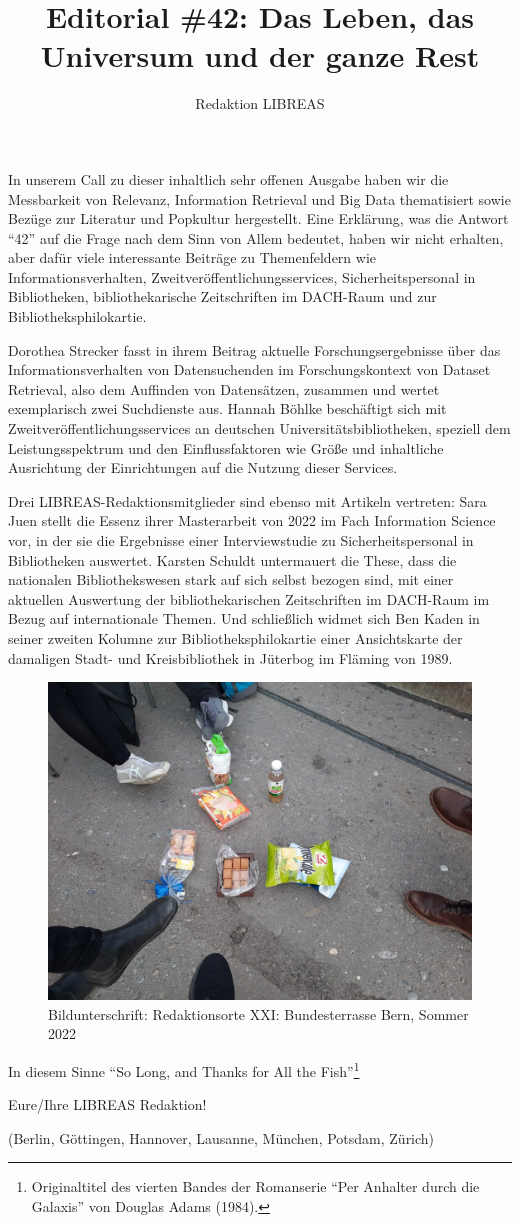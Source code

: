 \documentclass[a4paper,
fontsize=11pt,
oneside,
numbers=noperiodatend,
parskip=half-,
bibliography=totoc,
final
]{scrartcl}
\title{\LARGE{Editorial \#42: Das Leben, das Universum und der ganze Rest}}%
\author{Redaktion LIBREAS} %
\date{}
\begin{document}
\maketitle
\thispagestyle{fancyplain} 


In unserem Call zu dieser inhaltlich sehr offenen Ausgabe haben wir die
Messbarkeit von Relevanz, Information Retrieval und Big Data
thematisiert sowie Bezüge zur Literatur und Popkultur hergestellt. Eine
Erklärung, was die Antwort \enquote{42} auf die Frage nach dem Sinn von
Allem bedeutet, haben wir nicht erhalten, aber dafür viele interessante
Beiträge zu Themenfeldern wie Informationsverhalten,
Zweitveröffentlichungsservices, Sicherheitspersonal in Bibliotheken,
bibliothekarische Zeitschriften im DACH-Raum und zur
Bibliotheksphilokartie.

Dorothea Strecker fasst in ihrem Beitrag aktuelle Forschungsergebnisse
über das Informationsverhalten von Datensuchenden im Forschungskontext
von Dataset Retrieval, also dem Auffinden von Datensätzen, zusammen und
wertet exemplarisch zwei Suchdienste aus. Hannah Böhlke beschäftigt sich
mit Zweitveröffentlichungsservices an deutschen
Universitätsbibliotheken, speziell dem Leistungsspektrum und den
Einflussfaktoren wie Größe und inhaltliche Ausrichtung der Einrichtungen
auf die Nutzung dieser Services.

Drei LIBREAS-Redaktionsmitglieder sind ebenso mit Artikeln vertreten:
Sara Juen stellt die Essenz ihrer Masterarbeit von 2022 im Fach
Information Science vor, in der sie die Ergebnisse einer Interviewstudie
zu Sicherheitspersonal in Bibliotheken auswertet. Karsten Schuldt
untermauert die These, dass die nationalen Bibliothekswesen stark auf
sich selbst bezogen sind, mit einer aktuellen Auswertung der
bibliothekarischen Zeitschriften im DACH-Raum im Bezug auf
internationale Themen. Und schließlich widmet sich Ben Kaden in seiner
zweiten Kolumne zur Bibliotheksphilokartie einer Ansichtskarte der
damaligen Stadt- und Kreisbibliothek in Jüterbog im Fläming von 1989.

\begin{figure}[t!]
\centering
\includegraphics[width=.6\textwidth]{img/bern-snacks-feet.jpeg}
\caption{Bildunterschrift: Redaktionsorte XXI: Bundesterrasse Bern, Sommer 2022}
\end{figure}

In diesem Sinne \enquote{So Long, and Thanks for All the
Fish}\footnote{Originaltitel des vierten Bandes der Romanserie
  \enquote{Per Anhalter durch die Galaxis} von Douglas Adams (1984).}

Eure/Ihre LIBREAS Redaktion!

(Berlin, Göttingen, Hannover, Lausanne, München, Potsdam, Zürich)

\end{document}
